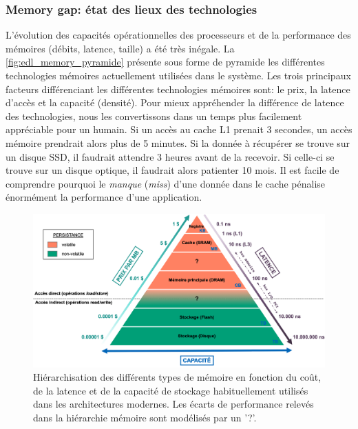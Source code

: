     \subsubsection{Memory gap: état des lieux des technologies}
    
        L'évolution des capacités opérationnelles des processeurs et de la performance des mémoires (débits, latence, taille) a été très inégale. La \autoref{fig:edl_memory_pyramide} présente sous forme de pyramide les différentes technologies mémoires actuellement utilisées dans le système. Les trois principaux facteurs différenciant les différentes technologies mémoires sont: le prix, la latence d'accès et la capacité (densité). Pour mieux appréhender la différence de latence des technologies, nous les convertissons dans un temps plus facilement appréciable pour un humain. Si un accès au cache L1 prenait 3 secondes, un accès mémoire prendrait alors plus de 5 minutes. Si la donnée à récupérer se trouve sur un disque SSD, il faudrait attendre 3 heures avant de la recevoir. Si celle-ci se trouve sur un disque optique, il faudrait alors patienter 10 mois. Il est facile de comprendre pourquoi le \textit{manque} (\textit{miss}) d'une donnée dans le cache pénalise énormément la performance d'une application. 
        
        \begin{figure}
            \center
            \includegraphics[width=17cm]{images/edl_memory_pyramide.png}
            \caption{\label{fig:edl_memory_pyramide} Hiérarchisation des différents types de mémoire en fonction du coût, de la latence et de la capacité de stockage habituellement utilisés dans les architectures modernes. Les écarts de performance relevés dans la hiérarchie mémoire sont modélisés par un '?'.}
        \end{figure}
        
